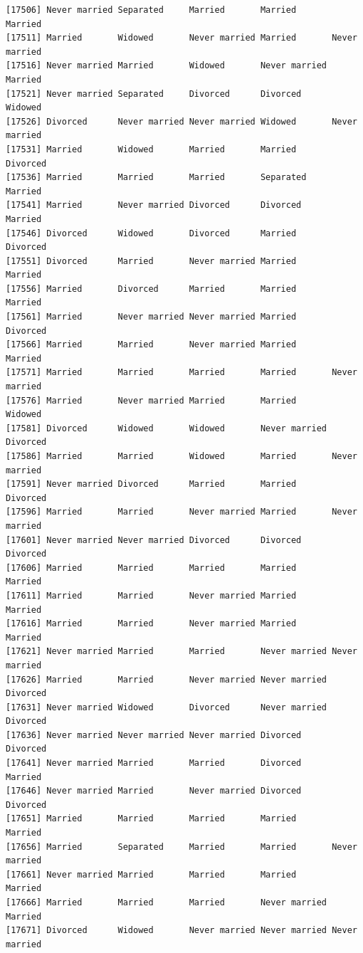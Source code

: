 \documentclass[
  letterpaper,
  DIV=11,
  numbers=noendperiod,
  oneside]{scrartcl}
\begin{document}
\begin{verbatim}
[17506] Never married Separated     Married       Married       Married      
[17511] Married       Widowed       Never married Married       Never married
[17516] Never married Married       Widowed       Never married Married      
[17521] Never married Separated     Divorced      Divorced      Widowed      
[17526] Divorced      Never married Never married Widowed       Never married
[17531] Married       Widowed       Married       Married       Divorced     
[17536] Married       Married       Married       Separated     Married      
[17541] Married       Never married Divorced      Divorced      Married      
[17546] Divorced      Widowed       Divorced      Married       Divorced     
[17551] Divorced      Married       Never married Married       Married      
[17556] Married       Divorced      Married       Married       Married      
[17561] Married       Never married Never married Married       Divorced     
[17566] Married       Married       Never married Married       Married      
[17571] Married       Married       Married       Married       Never married
[17576] Married       Never married Married       Married       Widowed      
[17581] Divorced      Widowed       Widowed       Never married Divorced     
[17586] Married       Married       Widowed       Married       Never married
[17591] Never married Divorced      Married       Married       Divorced     
[17596] Married       Married       Never married Married       Never married
[17601] Never married Never married Divorced      Divorced      Divorced     
[17606] Married       Married       Married       Married       Married      
[17611] Married       Married       Never married Married       Married      
[17616] Married       Married       Never married Married       Married      
[17621] Never married Married       Married       Never married Never married
[17626] Married       Married       Never married Never married Divorced     
[17631] Never married Widowed       Divorced      Never married Divorced     
[17636] Never married Never married Never married Divorced      Divorced     
[17641] Never married Married       Married       Divorced      Married      
[17646] Never married Married       Never married Divorced      Divorced     
[17651] Married       Married       Married       Married       Married      
[17656] Married       Separated     Married       Married       Never married
[17661] Never married Married       Married       Married       Married      
[17666] Married       Married       Married       Never married Married      
[17671] Divorced      Widowed       Never married Never married Never married

\end{verbatim}
\end{document}
